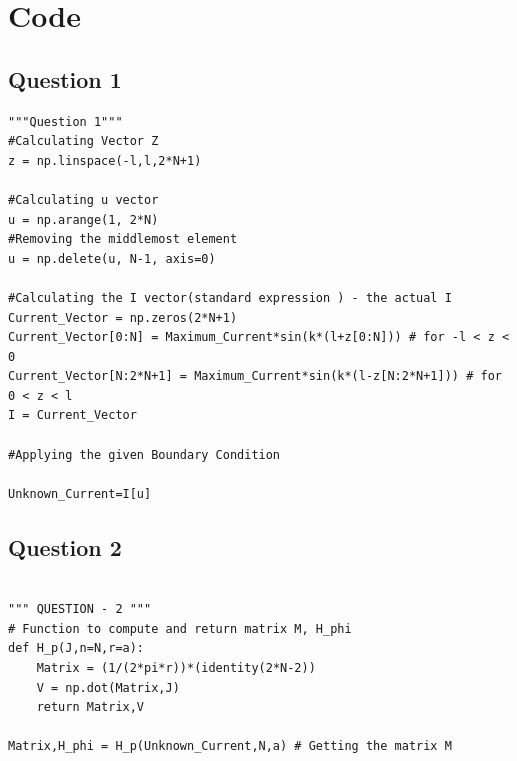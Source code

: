 \documentclass[11pt,a4paper]{article}
\begin{document}
\section{Code}

\subsection{Question 1}
\lstset{language=Python}
\lstset{frame=lines}
\lstset{basicstyle=\footnotesize}
\begin{lstlisting}
"""Question 1"""
#Calculating Vector Z 
z = np.linspace(-l,l,2*N+1)

#Calculating u vector
u = np.arange(1, 2*N)
#Removing the middlemost element
u = np.delete(u, N-1, axis=0)

#Calculating the I vector(standard expression ) - the actual I
Current_Vector = np.zeros(2*N+1)
Current_Vector[0:N] = Maximum_Current*sin(k*(l+z[0:N])) # for -l < z < 0
Current_Vector[N:2*N+1] = Maximum_Current*sin(k*(l-z[N:2*N+1])) # for 0 < z < l
I = Current_Vector

#Applying the given Boundary Condition

Unknown_Current=I[u]
\end{lstlisting}

\subsection{Question 2}
\lstset{language=Python}
\lstset{frame=lines}
\lstset{basicstyle=\footnotesize}
\begin{lstlisting}

""" QUESTION - 2 """
# Function to compute and return matrix M, H_phi
def H_p(J,n=N,r=a):
	Matrix = (1/(2*pi*r))*(identity(2*N-2))
	V = np.dot(Matrix,J)
	return Matrix,V

Matrix,H_phi = H_p(Unknown_Current,N,a) # Getting the matrix M
\end{lstlisting}
\end{document}
